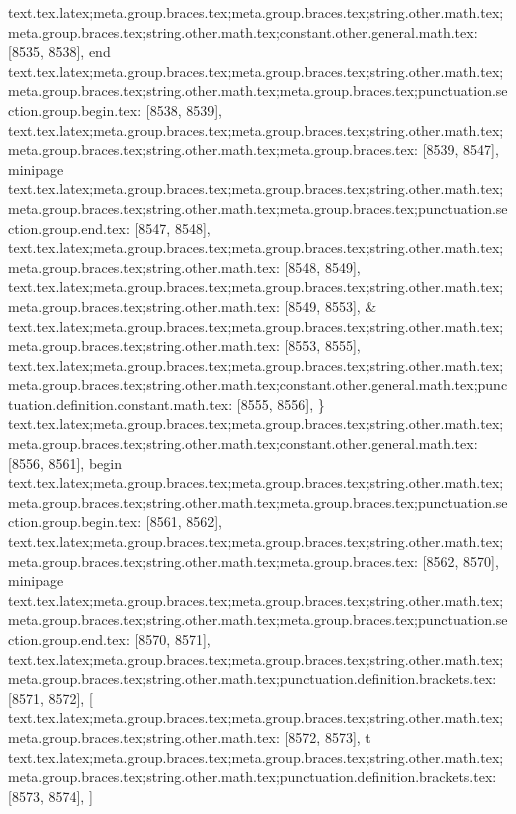{{{{{{{{{{{{{{{{{{{{{{{{{{{{{{{{{{{{{{{{{{{{{{{{{{{{{{{{{{{{{{{{{{{{{{{{{{{{{{{{{{{{{{{{{{{{{{{{{{{{{{{{{{{{{{{{{{{{{{{{{{{{{{{{{{{{{{{{{{{{{{{{{{{{{{{{{{{{{{{{{{{{{{{{{{{{{{{{{{{{{{{{{{{{{{{{{{{{{{{{{{{{{{{{{{{{{{{{{{{{{{{{{{{{{{{{{{{{{{{{{{{{{{{{{text.tex.latex;meta.group.braces.tex;meta.group.braces.tex;string.other.math.tex;meta.group.braces.tex;string.other.math.tex;constant.other.general.math.tex: [8535, 8538], {end}
text.tex.latex;meta.group.braces.tex;meta.group.braces.tex;string.other.math.tex;meta.group.braces.tex;string.other.math.tex;meta.group.braces.tex;punctuation.section.group.begin.tex: [8538, 8539], {{}
text.tex.latex;meta.group.braces.tex;meta.group.braces.tex;string.other.math.tex;meta.group.braces.tex;string.other.math.tex;meta.group.braces.tex: [8539, 8547], {minipage}
text.tex.latex;meta.group.braces.tex;meta.group.braces.tex;string.other.math.tex;meta.group.braces.tex;string.other.math.tex;meta.group.braces.tex;punctuation.section.group.end.tex: [8547, 8548], {}}
text.tex.latex;meta.group.braces.tex;meta.group.braces.tex;string.other.math.tex;meta.group.braces.tex;string.other.math.tex: [8548, 8549], {
}
text.tex.latex;meta.group.braces.tex;meta.group.braces.tex;string.other.math.tex;meta.group.braces.tex;string.other.math.tex: [8549, 8553], {  &
}
text.tex.latex;meta.group.braces.tex;meta.group.braces.tex;string.other.math.tex;meta.group.braces.tex;string.other.math.tex: [8553, 8555], {  }
text.tex.latex;meta.group.braces.tex;meta.group.braces.tex;string.other.math.tex;meta.group.braces.tex;string.other.math.tex;constant.other.general.math.tex;punctuation.definition.constant.math.tex: [8555, 8556], {\}
text.tex.latex;meta.group.braces.tex;meta.group.braces.tex;string.other.math.tex;meta.group.braces.tex;string.other.math.tex;constant.other.general.math.tex: [8556, 8561], {begin}
text.tex.latex;meta.group.braces.tex;meta.group.braces.tex;string.other.math.tex;meta.group.braces.tex;string.other.math.tex;meta.group.braces.tex;punctuation.section.group.begin.tex: [8561, 8562], {{}
text.tex.latex;meta.group.braces.tex;meta.group.braces.tex;string.other.math.tex;meta.group.braces.tex;string.other.math.tex;meta.group.braces.tex: [8562, 8570], {minipage}
text.tex.latex;meta.group.braces.tex;meta.group.braces.tex;string.other.math.tex;meta.group.braces.tex;string.other.math.tex;meta.group.braces.tex;punctuation.section.group.end.tex: [8570, 8571], {}}
text.tex.latex;meta.group.braces.tex;meta.group.braces.tex;string.other.math.tex;meta.group.braces.tex;string.other.math.tex;punctuation.definition.brackets.tex: [8571, 8572], {[}
text.tex.latex;meta.group.braces.tex;meta.group.braces.tex;string.other.math.tex;meta.group.braces.tex;string.other.math.tex: [8572, 8573], {t}
text.tex.latex;meta.group.braces.tex;meta.group.braces.tex;string.other.math.tex;meta.group.braces.tex;string.other.math.tex;punctuation.definition.brackets.tex: [8573, 8574], {]}
}}}}}}}}}}}}}}}}}}}}}}}}}}}}}}}}}}}}}}}}}}}}}}}}}}}}}}}}}}}}}}}}}}}}}}}}}}}}}}}}}}}}}}}}}}}}}}}}}}}}}}}}}}}}}}}}}}}}}}}}}}}}}}}}}}}}}}}}}}}}}}}}}}}}}}}}}}}}}}}}}}}}}}}}}}}}}}}}}}}}}}}}}}}}}}}}}}}}}}}}}}}}}}}}}}}}}}}}}}}}}}}}}}}}}}}}}}}}}}}}}}}}}}}}}}
